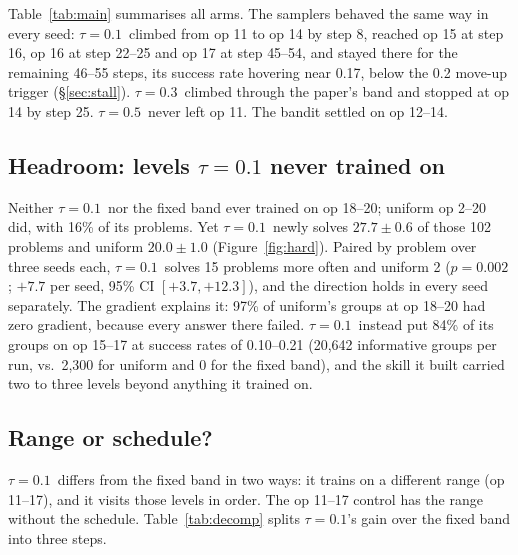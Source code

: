 \documentclass[11pt]{article}
\newcommand{\tauone}{$\tau{=}0.1$}
\newcommand{\tauthree}{$\tau{=}0.3$}
\newcommand{\taufive}{$\tau{=}0.5$}
\begin{document}
Table~\ref{tab:main} summarises all arms. The samplers behaved the same way in every seed: \tauone\ climbed
from op 11 to op 14 by step 8, reached op 15 at step 16, op 16 at step 22--25 and op 17 at step 45--54, and
stayed there for the remaining 46--55 steps, its success rate hovering near 0.17, below the 0.2 move-up
trigger (\S\ref{sec:stall}). \tauthree\ climbed through
the paper's band and stopped at op 14 by step 25. \taufive\ never left op 11. The bandit settled on op 12--14.

\subsection{Headroom: levels \texorpdfstring{\tauone}{tau=0.1} never trained on}

Neither \tauone\ nor the fixed band ever trained on op 18--20; uniform op 2--20 did, with 16\% of its
problems. Yet \tauone\ newly solves $27.7\pm0.6$ of those 102 problems and uniform $20.0\pm1.0$
(Figure~\ref{fig:hard}). Paired by problem over three seeds each, \tauone\ solves 15 problems more often and
uniform 2 ($p=0.002$; $+7.7$ per seed, 95\% CI $[+3.7, +12.3]$), and the direction holds in every seed
separately. The gradient explains it: 97\% of uniform's groups at op 18--20 had zero gradient, because every
answer there failed. \tauone\ instead put 84\% of its groups on op 15--17 at success rates of 0.10--0.21
(20,642 informative groups per run, vs.\ 2,300 for uniform and 0 for the fixed band), and the skill it
built carried two to three levels beyond anything it trained on.

\subsection{Range or schedule?}
\label{sec:range}

\tauone\ differs from the fixed band in two ways: it trains on a different range (op 11--17), and it visits
those levels in order. The op 11--17 control has the range without the schedule. Table~\ref{tab:decomp}
splits \tauone's gain over the fixed band into three steps.

\begin{table}[t]
\centering
\small

\caption{Decomposition of \tauone's gain over the fixed band in newly solved problems per seed.
\textsuperscript{a}uniform op 2--20 $-$ fixed band; \textsuperscript{b}control op 11--17 $-$ uniform op
2--20; \textsuperscript{c}\tauone\ $-$ control.}
\label{tab:decomp}
\end{table}
\end{document}
